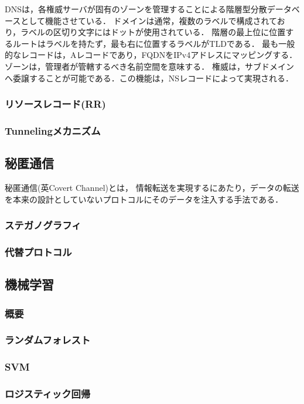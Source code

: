 \documentclass[12pt]{jarticle} %
\begin{document}
DNSは，各権威サーバが固有のゾーンを管理することによる階層型分散データベースとして機能させている．
ドメインは通常，複数のラベルで構成されており，ラベルの区切り文字にはドットが使用されている．
階層の最上位に位置するルートはラベルを持たず，最も右に位置するラベルがTLDである．
最も一般的なレコードは，Aレコードであり，FQDNをIPv4アドレスにマッピングする．
ゾーンは，管理者が管轄するべき名前空間を意味する．
権威は，サブドメインへ委譲することが可能である．この機能は，NSレコードによって実現される．
\subsubsection{リソースレコード(RR)}
\subsubsection{Tunnelingメカニズム}
\subsection{秘匿通信}
秘匿通信(英Covert Channel)とは，
情報転送を実現するにあたり，データの転送を本来の設計としていないプロトコルにそのデータを注入する手法である．
\subsubsection{ステガノグラフィ}
\subsubsection{代替プロトコル}
\subsection{機械学習}
\subsubsection{概要}
\subsubsection{ランダムフォレスト}
\subsubsection{SVM}
\subsubsection{ロジスティック回帰}
\end{document}
